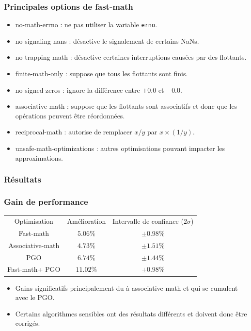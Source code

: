 \documentclass{beamer}
\begin{document}
\begin{frame}[fragile]
    \frametitle{Principales options de fast-math}

    \begin{itemize}
        \item no-math-errno : ne pas utiliser la variable \verb'erno'.
        \item no-signaling-nans : désactive le signalement de certains NaNs.
        \item no-trapping-math : désactive certaines interruptions causées par des flottants.
        \item finite-math-only : suppose que tous les flottants sont finis.
        \item no-signed-zeros : ignore la différence entre $+0.0$ et $-0.0$.
        \item associative-math : suppose que les flottants sont associatifs et donc que les opérations peuvent être réordonnées.
        \item reciprocal-math : autorise de remplacer $x/y$ par $x \times (1/y)$.
        \item unsafe-math-optimizations : autres optimisations pouvant impacter les approximations.
    \end{itemize}
\end{frame}

\subsubsection{Résultats}

\begin{frame}[fragile]
    \frametitle{Gain de performance}

    \begin{center}
        \begin{tabular}{ c c c }
            Optimisation                    & Amélioration & Intervalle de confiance ($2\sigma$) \\
            Fast-math\footnotemark[1]       & $5.06\%$     & $\pm 0.98\%$                        \\
            Associative-math                & $4.73\%$     & $\pm 1.51\%$                        \\
            PGO                             & $6.74\%$     & $\pm 1.44\%$                        \\
            Fast-math\footnotemark[1] + PGO & $11.02\%$    & $\pm 0.98\%$
        \end{tabular}
    \end{center}

    \begin{itemize}
        \item Gains significatifs principalement du à associative-math et qui se cumulent avec le PGO.
        \item Certains algorithmes sensibles ont des résultats différents et doivent donc être corrigés.
    \end{itemize}

\end{frame}
\end{document}

